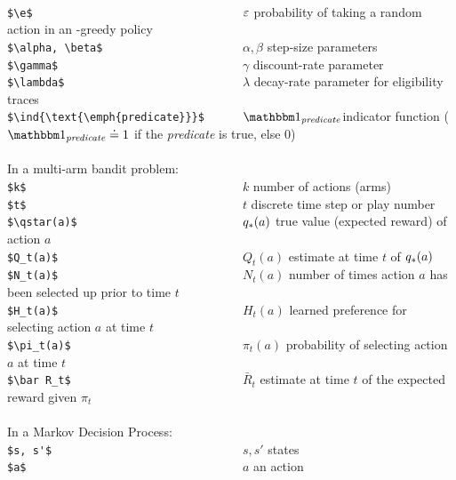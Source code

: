 \documentclass[10pt,fleqn]{article}
\begin{document}
\begin{tabbing}
\\
\>\verb+$\e$                                 +\>$\mbox{$\varepsilon$}$                \> probability of taking a random action in an \e-greedy policy\\
\>\verb+$\alpha, \beta$                      +\>$\alpha, \beta$     \> step-size parameters\\
\>\verb+$\gamma$                             +\>$\gamma$            \> discount-rate parameter\\
\>\verb+$\lambda$                            +\>$\lambda$           \> decay-rate parameter for eligibility traces\\
\>\verb+$\ind{\text{\emph{predicate}}}$      +\>$\ind{\text{\emph{predicate}}}$\>indicator function ($\ind{\text{\emph{predicate}}}\defeq1$ if the \emph{predicate} is true, else 0)\\
\\
\>In a multi-arm bandit problem:\\
\>\verb+$k$                                  +\>$k$                 \> number of actions (arms)\\
\>\verb+$t$                                  +\>$t$                 \> discrete time step or play number\\
\>\verb+$\qstar(a)$                          +\>$q_*(a)$         \> true value (expected reward) of action $a$\\
\>\verb+$Q_t(a)$                             +\>$Q_t(a)$            \> estimate at time $t$ of $q_*(a)$\\
\>\verb+$N_t(a)$                             +\>$N_t(a)$            \> number of times action $a$ has been selected up prior to time $t$\\
\>\verb+$H_t(a)$                             +\>$H_t(a)$            \> learned preference for selecting action $a$ at time $t$\\
\>\verb+$\pi_t(a)$                           +\>$\pi_t(a)$          \> probability of selecting action $a$ at time $t$\\
\>\verb+$\bar R_t$                           +\>$\bar R_t$          \> estimate at time $t$ of the expected reward given $\pi_t$\\
\\
\>In a Markov Decision Process:\\
\>\verb+$s, s'$                              +\>$s, s'$             \> states\\
\>\verb+$a$                                  +\>$a$                 \> an action\\

\end{tabbing}
\end{document}
